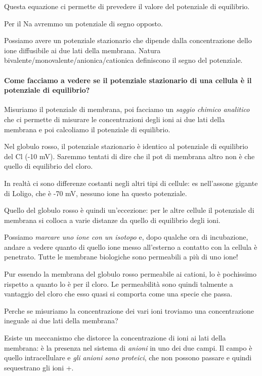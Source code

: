 \documentclass[a4paper,12pt]{article}
\begin{document}
Questa equazione ci permette di prevedere il valore del potenziale di equilibrio.

Per il Na avremmo un potenziale di segno opposto.

Possiamo avere un potenziale stazionario che dipende dalla concentrazione dello ione diffusibile ai due lati della membrana. Natura bivalente/monovalente/anionica/cationica definiscono il segno del potenziale.

\paragraph{Come facciamo a vedere se il potenziale stazionario di una cellula è il potenziale di equilibrio?}

Misuriamo il potenziale di membrana, poi facciamo un \emph{saggio chimico analitico} che ci permette di misurare le concentrazioni degli ioni ai due lati della membrana e poi calcoliamo il potenziale di equilibrio.

Nel globulo rosso, il potenziale stazionario è identico al potenziale di equilibrio del Cl (-10 mV). Saremmo tentati di dire che il pot di membrana altro non è che quello di equilibrio del cloro. 

In realtà ci sono differenze costanti negli altri tipi di cellule: es nell’assone gigante di Loligo, che è -70 mV, nessuno ione ha questo potenziale.

Quello del globulo rosso è quindi un’eccezione: per le altre cellule il potenziale di membrana si colloca a varie distanze da quello di equilibrio degli ioni.

Possiamo \emph{marcare uno ione con un isotopo} e, dopo qualche ora di incubazione, andare a vedere quanto di quello ione messo all’esterno a contatto con la cellula è penetrato. Tutte le membrane biologiche sono permeabili a più di uno ione!

Pur essendo la membrana del globulo rosso permeabile ai cationi, lo è pochissimo rispetto a quanto lo è per il cloro. Le permeabilità sono quindi talmente a vantaggio del cloro che esso quasi si comporta come una specie che passa.

Perche se misuriamo la concentrazione dei vari ioni troviamo una concentrazione ineguale ai due lati della membrana?

Esiste un meccanismo che distorce la concentrazione di ioni ai lati della membrana: è la presenza nel sistema di \emph{anioni} in uno dei due campi. Il campo è quello intracellulare e \emph{gli anioni sono proteici}, che non possono passare e quindi sequestrano gli ioni +.
\end{document}
